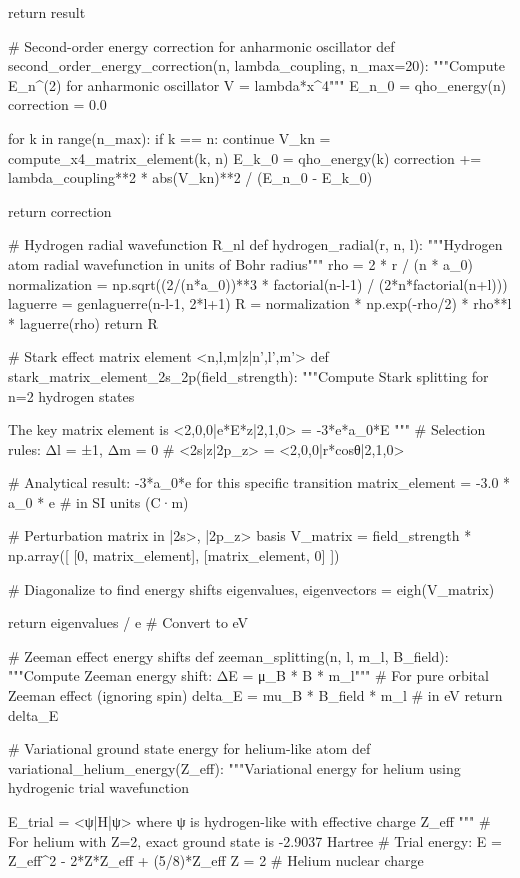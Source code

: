 \documentclass[a4paper, 11pt]{article}
\begin{document}
\begin{pycode}
    return result

# Second-order energy correction for anharmonic oscillator
def second_order_energy_correction(n, lambda_coupling, n_max=20):
    """Compute E_n^(2) for anharmonic oscillator V = lambda*x^4"""
    E_n_0 = qho_energy(n)
    correction = 0.0

    for k in range(n_max):
        if k == n:
            continue
        V_kn = compute_x4_matrix_element(k, n)
        E_k_0 = qho_energy(k)
        correction += lambda_coupling**2 * abs(V_kn)**2 / (E_n_0 - E_k_0)

    return correction

# Hydrogen radial wavefunction R_nl
def hydrogen_radial(r, n, l):
    """Hydrogen atom radial wavefunction in units of Bohr radius"""
    rho = 2 * r / (n * a_0)
    normalization = np.sqrt((2/(n*a_0))**3 * factorial(n-l-1) / (2*n*factorial(n+l)))
    laguerre = genlaguerre(n-l-1, 2*l+1)
    R = normalization * np.exp(-rho/2) * rho**l * laguerre(rho)
    return R

# Stark effect matrix element <n,l,m|z|n',l',m'>
def stark_matrix_element_2s_2p(field_strength):
    """Compute Stark splitting for n=2 hydrogen states

    The key matrix element is <2,0,0|e*E*z|2,1,0> = -3*e*a_0*E
    """
    # Selection rules: Δl = ±1, Δm = 0
    # <2s|z|2p_z> = <2,0,0|r*cosθ|2,1,0>

    # Analytical result: -3*a_0*e for this specific transition
    matrix_element = -3.0 * a_0 * e  # in SI units (C·m)

    # Perturbation matrix in {|2s>, |2p_z>} basis
    V_matrix = field_strength * np.array([
        [0, matrix_element],
        [matrix_element, 0]
    ])

    # Diagonalize to find energy shifts
    eigenvalues, eigenvectors = eigh(V_matrix)

    return eigenvalues / e  # Convert to eV

# Zeeman effect energy shifts
def zeeman_splitting(n, l, m_l, B_field):
    """Compute Zeeman energy shift: ΔE = μ_B * B * m_l"""
    # For pure orbital Zeeman effect (ignoring spin)
    delta_E = mu_B * B_field * m_l  # in eV
    return delta_E

# Variational ground state energy for helium-like atom
def variational_helium_energy(Z_eff):
    """Variational energy for helium using hydrogenic trial wavefunction

    E_trial = <ψ|H|ψ> where ψ is hydrogen-like with effective charge Z_eff
    """
    # For helium with Z=2, exact ground state is -2.9037 Hartree
    # Trial energy: E = Z_eff^2 - 2*Z*Z_eff + (5/8)*Z_eff
    Z = 2  # Helium nuclear charge


\end{pycode}
\end{document}
